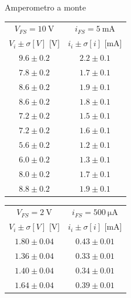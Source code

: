 \documentclass{article}
\begin{document}
\begin{figure}
\begin{center}
    \large{Amperometro a monte}
\end{center}
\begin{multicols}{2}
\begin{center}
\begin{tabular}{c|c} 
$V_{FS}=\SI{10}{\volt}$&$i_{FS}=\SI{5}{\milli\ampere}$\\
$V_i \pm \sigma [V]$ [\si{\volt}] & $i_i \pm \sigma [i]$ [\si{\milli\ampere}]\\
[0.5ex]
\hline
$9.6 \pm 0.2 $&$2.2 \pm 0.1$\\

$7.8 \pm 0.2 $&$1.7 \pm 0.1$\\

$8.6 \pm 0.2 $&$1.9 \pm 0.1$\\

$8.6 \pm 0.2 $&$1.8 \pm 0.1$\\

$7.2 \pm 0.2 $&$1.5 \pm 0.1$\\

$7.2 \pm 0.2 $&$1.6 \pm 0.1$\\

$5.6 \pm 0.2 $&$1.2 \pm 0.1$\\

$6.0 \pm 0.2 $&$1.3 \pm 0.1$\\

$8.0 \pm 0.2 $&$1.7 \pm 0.1$\\

$8.8 \pm 0.2 $&$1.9 \pm 0.1$\\

\end{tabular}
\end{center}

\begin{center}
\begin{tabular}{c|c} 
$V_{FS}=\SI{2}{\volt}$&$i_{FS}=\SI{500}{\micro\ampere}$\\
$V_i \pm \sigma [V]$        [\si{\volt}] & $i_i \pm \sigma [i]$         [\si{\milli\ampere}]\\
[0.5ex]
\hline
$1.80 \pm 0.04 $& $0.43 \pm 0.01$\\
$1.36 \pm 0.04 $&$0.33 \pm 0.01$\\

$1.40 \pm 0.04 $&$0.34 \pm 0.01$\\

$1.64 \pm 0.04 $&$0.39 \pm 0.01$\\


\end{tabular}
\end{center}
\end{multicols}
\end{figure}
\end{document}
